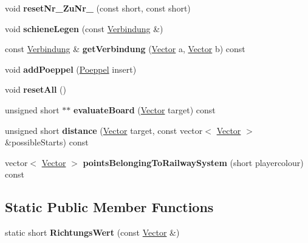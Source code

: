 \begin{DoxyCompactItemize}
\item 
\hypertarget{class_zustand_adcae9b5b3c032ceefdaac7c49fe6674f}{void {\bfseries reset\-Nr\-\_\-\-Zu\-Nr\-\_\-} (const short, const short)}\label{class_zustand_adcae9b5b3c032ceefdaac7c49fe6674f}

\item 
\hypertarget{class_zustand_a326f241888c2a8897c934d25a8d643b9}{void {\bfseries schiene\-Legen} (const \hyperlink{class_verbindung}{Verbindung} \&)}\label{class_zustand_a326f241888c2a8897c934d25a8d643b9}

\item 
\hypertarget{class_zustand_a1a0b109709853779b7fd4fa720dadbc3}{const \hyperlink{class_verbindung}{Verbindung} \& {\bfseries get\-Verbindung} (\hyperlink{class_vector}{Vector} a, \hyperlink{class_vector}{Vector} b) const }\label{class_zustand_a1a0b109709853779b7fd4fa720dadbc3}

\item 
\hypertarget{class_zustand_aaf796c394dae78069ef3891d75e53e67}{void {\bfseries add\-Poeppel} (\hyperlink{class_poeppel}{Poeppel} insert)}\label{class_zustand_aaf796c394dae78069ef3891d75e53e67}

\item 
\hypertarget{class_zustand_a948904b2d1d4da0868a6a4f063923f3f}{void {\bfseries reset\-All} ()}\label{class_zustand_a948904b2d1d4da0868a6a4f063923f3f}

\item 
\hypertarget{class_zustand_abab7008b6a279f38951a5cc5afbd9bdf}{unsigned short $\ast$$\ast$ {\bfseries evaluate\-Board} (\hyperlink{class_vector}{Vector} target) const }\label{class_zustand_abab7008b6a279f38951a5cc5afbd9bdf}

\item 
\hypertarget{class_zustand_a14e96fea8263cb032814d6997972b0c1}{unsigned short {\bfseries distance} (\hyperlink{class_vector}{Vector} target, const vector$<$ \hyperlink{class_vector}{Vector} $>$ \&possible\-Starts) const }\label{class_zustand_a14e96fea8263cb032814d6997972b0c1}

\item 
\hypertarget{class_zustand_a3f40e865685066f67cc7fcaa44154b11}{vector$<$ \hyperlink{class_vector}{Vector} $>$ {\bfseries points\-Belonging\-To\-Railway\-System} (short playercolour) const }\label{class_zustand_a3f40e865685066f67cc7fcaa44154b11}

\end{DoxyCompactItemize}
\subsection*{Static Public Member Functions}
\begin{DoxyCompactItemize}
\item 
\hypertarget{class_zustand_a5962a9e80efba68d605dda8a20431200}{static short {\bfseries Richtungs\-Wert} (const \hyperlink{class_vector}{Vector} \&)}\label{class_zustand_a5962a9e80efba68d605dda8a20431200}

\end{DoxyCompactItemize}
